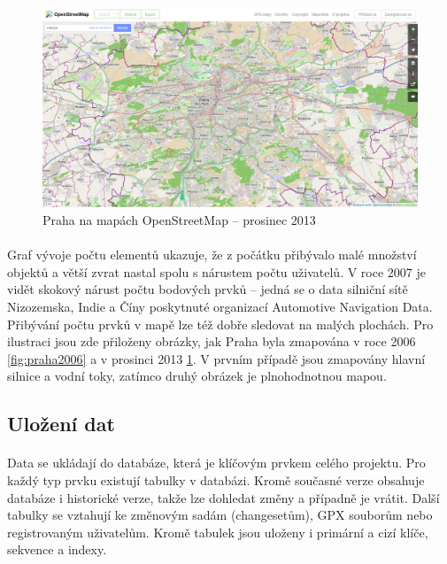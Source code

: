 \documentclass[11pt,a4paper,titlepage,oneside]{book}
\begin{document}

		\begin{figure}[!h]
			\begin{center}
				\includegraphics[width=12cm]{obrazky/Osm-201312-praha.png}
				\caption{Praha na mapách OpenStreetMap -- prosinec 2013}
				\label{fig:praha2013}
			\end{center}
		\end{figure}




		\paragraph{} Graf vývoje počtu elementů ukazuje, že z počátku přibývalo malé množství objektů a větší zvrat nastal spolu s nárustem počtu uživatelů. V roce 2007 je vidět skokový nárust počtu bodových prvků -- jedná se o data silniční sítě Nizozemska, Indie a Číny poskytnuté organizací Automotive Navigation Data. 
		Přibývání počtu prvků v mapě lze též dobře sledovat na malých plochách. Pro ilustraci jsou zde přiloženy obrázky, jak Praha byla zmapována v roce 2006 \ref{fig:praha2006} a v prosinci 2013 \ref{fig:praha2013}. V prvním případě jsou zmapovány hlavní silnice a vodní toky, zatímco druhý obrázek je plnohodnotnou mapou.
	
	\subsection{Uložení dat}
		\paragraph{} Data se ukládají do databáze, která je klíčovým prvkem celého projektu. Pro každý typ prvku existují tabulky v databázi. Kromě současné verze obsahuje databáze i historické verze, takže lze dohledat změny a případně je vrátit. Další tabulky se vztahují ke změnovým sadám (changesetům), GPX souborům nebo registrovaným uživatelům. Kromě tabulek jsou uloženy i primární a cizí klíče, sekvence a indexy.
\end{document}
